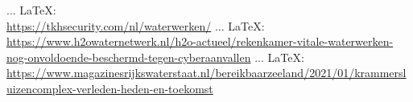 \begin{thebibliography}{99}
 ... \LaTeX:\\ \url{https://tkhsecurity.com/nl/waterwerken/}
 ... \LaTeX:\\ \url{https://www.h2owaternetwerk.nl/h2o-actueel/rekenkamer-vitale-waterwerken-nog-onvoldoende-beschermd-tegen-cyberaanvallen}
 ... \LaTeX:\\ \url{https://www.magazinesrijkswaterstaat.nl/bereikbaarzeeland/2021/01/krammersluizencomplex-verleden-heden-en-toekomst}



%
%
%




\end{thebibliography}
